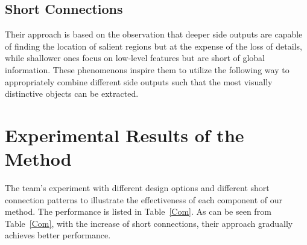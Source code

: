 \documentclass[10pt,twocolumn,letterpaper]{article}
\begin{document}
\subsection{Short Connections}

Their approach is based on the observation that deeper side outputs are capable of finding the location of salient regions but at the expense of the loss of details, while shallower ones focus on low-level features but are short of global information. These phenomenons inspire them to utilize the following way to appropriately combine different side outputs such that the most visually distinctive objects can be extracted.

\section{Experimental Results of the Method}

The team's experiment with different design options and different short connection patterns to illustrate the effectiveness of each component of our method. The performance is listed in Table~\ref{Com}. As can be seen from Table~\ref{Com}, with the increase of short connections, their approach gradually achieves better performance.



{\small


}
\end{document}
